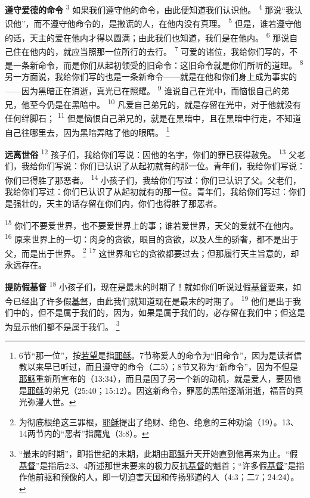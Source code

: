 \textbf{遵守爱德的命令\quad}
\textsuperscript{3}
如果我们遵守他的命令，由此便知道我们认识他。
\textsuperscript{4}
那说“我认识他”，而不遵守他命令的，是撒谎的人，在他内没有真理。
\textsuperscript{5}
但是，谁若遵守他的话，天主的爱在他内才得以圆满；由此我们也知道，我们是在他内。
\textsuperscript{6}
那说自己住在他内的，就应当照那一位所行的去行。
\textsuperscript{7}
可爱的诸位，我给你们写的，不是一条新命令，而是你们从起初领受的旧命令：这旧命令就是你们所听的道理。
\textsuperscript{8}
另一方面说，我给你们写的也是一条新命令——就是在他和你们身上成为事实的——因为黑暗正在消逝，真光已在照耀。
\textsuperscript{9}
谁说自己在光中，而恼恨自己的弟兄，他至今仍是在黑暗中。
\textsuperscript{10}
凡爱自己弟兄的，就是存留在光中，对于他就没有任何绊脚石；
\textsuperscript{11}
但是恼恨自己弟兄的，就是在黑暗中，且在黑暗中行走，不知道自己往哪里去，因为黑暗弄瞎了他的眼睛。
\footnote{6节“那一位”，按\uline{若望}是指\uline{耶稣}。7节称爱人的命令为“旧命令”，因为是读者信教以来早已听过，而且遵守的命令（二5）；8节又称为“新命令”，因为不但是\uline{耶稣}重新所宣布的（13:34），而且是因了另一个新的动机，就是爱人，要因他是\uline{耶稣}的弟兄（25:40；15:12）。因这新命令，罪恶的黑暗逐渐消逝，福音的真光弥漫人世。}

\textbf{远离世俗\quad}
\textsuperscript{12}
孩子们，我给你们写说：因他的名字，你们的罪已获得赦免。
\textsuperscript{13}
父老们，我给你们写说：你们已认识了从起初就有的那一位。青年们，我给你们写说：你们已得胜了那恶者。
\textsuperscript{14}
小孩子们，我给你们写过：你们已认识了父。父老们，我给你们写过：你们已认识了从起初就有的那一位。青年们，我给你们写过：你们是强壮的，天主的话存留在你们内，你们也得胜了那恶者。

\textsuperscript{15}
你们不要爱世界，也不要爱世界上的事；谁若爱世界，天父的爱就不在他内。
\textsuperscript{16}
原来世界上的一切：肉身的贪欲，眼目的贪欲，以及人生的骄奢，都不是出于父，而是出于世界。
\footnote{为彻底根绝这三罪根，\uline{耶稣}提出了绝财、绝色、绝意的三种劝谕（19）。13、14两节内的“恶者”指魔鬼（3:8）。}
\textsuperscript{17}
这世界和它的贪欲都要过去；但那履行天主旨意的，却永远存在。

\textbf{提防假基督\quad}
\textsuperscript{18}
小孩子们，现在是最末的时期了！就如你们听说过假\uline{基督}要来，如今已经出了许多假\uline{基督}，由此我们就知道现在是最末的时期了。
\textsuperscript{19}
他们是出于我们中的，但不是属于我们的，因为，如果是属于我们的，必存留在我们中；但这是为显示他们都不是属于我们。
\footnote{“最末的时期”，即指世纪的末期，此期由\uline{耶稣}升天开始直到他再来为止。“假\uline{基督}”是指后2:3、4所述那世末要来的极力反抗\uline{基督}的魁首；“许多假\uline{基督}”是指作他前驱和预像的人，即一切迫害天国和传扬邪道的人（4:3；二7；24:24）。}

